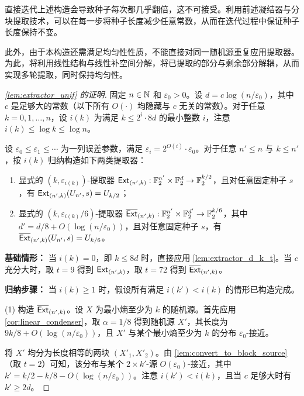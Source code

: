 直接迭代上述构造会导致种子每次都几乎翻倍，这不可接受。利用前述凝结器与分块提取技术，可以在每一步将种子长度减少任意常数，从而在迭代过程中保证种子长度保持不变。

此外，由于本构造还需满足均匀性性质，不能直接对同一随机源重复应用提取器。为此，将利用线性结构与线性补空间分解，将已提取的部分与剩余部分解耦，从而实现多轮提取，同时保持均匀性。

\begin{proof}[\cref{lem:extractor_unif} 的证明]
    固定 $n \in \mathbb{N}$ 和 $\varepsilon_0 > 0$。设 $d = c \log (n / \varepsilon_0)$，其中 $c$ 是足够大的常数（以下所有 $O(\cdot)$ 均隐藏与 $c$ 无关的常数）。对于任意 $k = 0,1,\ldots,n$，设 $i(k)$ 为满足 $k \le 2^i \cdot 8d$ 的最小整数 $i$，注意 $i(k) \le \log k \le \log n$。

    设 $\varepsilon_0 \le \varepsilon_1 \le \cdots$ 为一列误差参数，满足 $\varepsilon_i = 2^{O(i)} \cdot \varepsilon_0$。对于任意 $n' \le n$ 与 $k \le n'$，按 $i(k)$ 归纳构造如下两类提取器：
    \begin{enumerate}
        \item 显式的 $(k, \varepsilon_{i(k)})$-提取器 $\mathsf{Ext}_{(n', k)} : \mathbb{F}_2^{n'} \times \mathbb{F}_2^d \to \mathbb{F}_2^{k/2}$，且对任意固定种子 $s$，有 $\mathsf{Ext}_{(n', k)}(U_{n'}, s) = U_{k/2}$；
        
        \item 显式的 $(k, \varepsilon_{i(k)}/6)$-提取器 $\overline{\mathsf{Ext}}_{(n', k)} : \mathbb{F}_2^{n'} \times \mathbb{F}_2^{d'} \to \mathbb{F}_2^{k/6}$，其中 $d' = d/8 + O(\log(n/\varepsilon_0))$，且对任意固定种子 $s$，有 $\overline{\mathsf{Ext}}_{(n', k)}(U_{n'}, s) = U_{k/6}$。
    \end{enumerate}

    \textbf{基础情形：} 当 $i(k) = 0$，即 $k \le 8d$ 时，直接应用 \cref{lem:extractor_d_k_t}。当 $c$ 充分大时，取 $t=9$ 得到 $\mathsf{Ext}_{(n',k)}$，取 $t=72$ 得到 $\overline{\mathsf{Ext}}_{(n',k)}$。

    \medskip

    \textbf{归纳步骤：} 当 $i(k) \ge 1$ 时，假设所有满足 $i(k') < i(k)$ 的情形已构造完成。

    (1) 构造 $\overline{\mathsf{Ext}}_{(n', k)}$。设 $X$ 为最小熵至少为 $k$ 的随机源。首先应用 \cref{cor:linear_condenser}，取 $\alpha = 1 / 8$ 得到随机源 $X'$，其长度为 $9k/8 + O(\log(n/\varepsilon_0))$，且 $X'$ 与某个最小熵至少为 $k$ 的分布 $\varepsilon_0$-接近。

    将 $X'$ 均分为长度相等的两块 $(X'_1, X'_2)$。由 \cref{lem:convert_to_block_source}（取 $t=2$）可知，该分布与某个 $2 \times k'$-源 $O(\varepsilon_0)$-接近，其中 $k' = k/2 - k/8 - O(\log(n/\varepsilon_0))$。注意 $i(k') < i(k)$，且当 $c$ 足够大时有 $k' \ge 2d$。


\end{proof}
